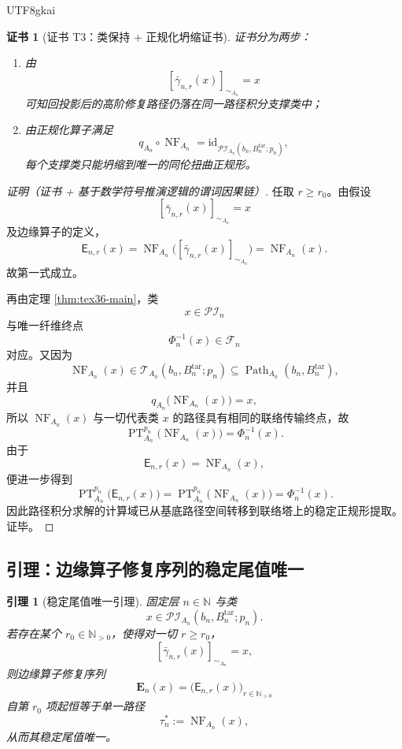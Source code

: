 \documentclass[12pt]{article}
\newtheorem{lemma}{引理}[section]
\newtheorem{Certificate}{证书}[section]
\newcommand{\NN}{\mathbb{N}}
\newcommand{\Path}{\operatorname{Path}}
\newcommand{\PT}{\operatorname{PT}}
\newcommand{\NF}{\operatorname{NF}}
\newcommand{\id}{\mathrm{id}}
\begin{document}
\begin{CJK*}{UTF8}{gkai}
\begin{Certificate}[证书 T3：类保持 + 正规化坍缩证书]
\label{cert:tex36-t3}
证书分为两步：
\begin{enumerate}
  \item 由
  \[
    [\bar{\gamma}_{n,r}(x)]_{\sim_{A_n}}=x
  \]
  可知回投影后的高阶修复路径仍落在同一路径积分支撑类中；
  \item 由正规化算子满足
  \[
    q_{A_n}\circ \NF_{A_n}=\id_{\mathcal{PI}_{A_n}(b_n,B_n^{\mathrm{tar}};p_n)},
  \]
  每个支撑类只能坍缩到唯一的同伦扭曲正规形。
\end{enumerate}
\end{Certificate}

\begin{proof}[证明（证书 + 基于数学符号推演逻辑的谓词因果链）]
任取 $r\ge r_0$。由假设
\[
  [\bar{\gamma}_{n,r}(x)]_{\sim_{A_n}}=x
\]
及边缘算子的定义，
\[
  \mathsf E_{n,r}(x)
  =
  \NF_{A_n}\bigl([\bar{\gamma}_{n,r}(x)]_{\sim_{A_n}}\bigr)
  =
  \NF_{A_n}(x).
\]
故第一式成立。

再由定理 \ref{thm:tex36-main}，类
\[
  x\in \mathcal{PI}_n
\]
与唯一纤维终点
\[
  \Phi_n^{-1}(x)\in \mathcal{F}_n
\]
对应。又因为
\[
  \NF_{A_n}(x)\in \mathcal{T}_{A_n}(b_n,B_n^{\mathrm{tar}};p_n)\subseteq \Path_{A_n}(b_n,B_n^{\mathrm{tar}}),
\]
并且
\[
  q_{A_n}\bigl(\NF_{A_n}(x)\bigr)=x,
\]
所以 $\NF_{A_n}(x)$ 与一切代表类 $x$ 的路径具有相同的联络传输终点，故
\[
  \PT_{A_n}^{p_n}\bigl(\NF_{A_n}(x)\bigr)=\Phi_n^{-1}(x).
\]
由于
\[
  \mathsf E_{n,r}(x)=\NF_{A_n}(x),
\]
便进一步得到
\[
  \PT_{A_n}^{p_n}\bigl(\mathsf E_{n,r}(x)\bigr)
  =
  \PT_{A_n}^{p_n}\bigl(\NF_{A_n}(x)\bigr)
  =
  \Phi_n^{-1}(x).
\]
因此路径积分求解的计算域已从基底路径空间转移到联络塔上的稳定正规形提取。证毕。
\end{proof}

\subsection{引理：边缘算子修复序列的稳定尾值唯一}
\label{subsec:tex36-edge-stable}

\begin{lemma}[稳定尾值唯一引理]
\label{lem:tex36-edge-stable}
固定层 $n\in\NN$ 与类
\[
  x\in \mathcal{PI}_{A_n}(b_n,B_n^{\mathrm{tar}};p_n).
\]
若存在某个 $r_0\in\NN_{>0}$，使得对一切 $r\ge r_0$，
\[
  [\bar{\gamma}_{n,r}(x)]_{\sim_{A_n}}=x,
\]
则边缘算子修复序列
\[
  \mathbf E_n(x)=\bigl(\mathsf E_{n,r}(x)\bigr)_{r\in\NN_{>0}}
\]
自第 $r_0$ 项起恒等于单一路径
\[
  \tau_n^\ast:=\NF_{A_n}(x),
\]
从而其稳定尾值唯一。
\end{lemma}


\end{CJK*}
\end{document}

